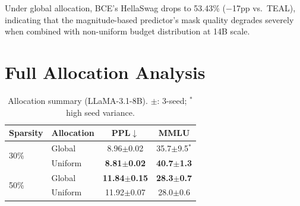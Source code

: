 \begin{table}[h]
\centering
\caption{Qwen-2.5-14B at 30\% nominal sparsity. Actual sparsity differs: KL 29.6\% (3-seed), TEAL 29.3\% (target 30\%). \textbf{Bold}: best sparse per column per group. BCE collapses to 6.4\% native sparsity (\S\ref{sec:method:gradient}), so forced global top-$k$ is used.}
\label{tab:14b}
\small
{}
\end{table}

Under global allocation, BCE's HellaSwag drops to 53.43\% ($-$17pp vs.\ TEAL), indicating that the magnitude-based predictor's mask quality degrades severely when combined with non-uniform budget distribution at 14B scale.

\section{Full Allocation Analysis}
\label{app:alloc_full}

\begin{table}[t]
\centering
\caption{Allocation summary (LLaMA-3.1-8B). $\pm$: 3-seed; $^\ast$high seed variance.}
\label{tab:phase}
\footnotesize
\begin{tabular}{llcc}
\toprule
Sparsity & Allocation & PPL$\downarrow$ & MMLU \\
\midrule
\multirow{2}{*}{30\%}
& Global & 8.96$\pm$0.02 & 35.7$\pm$9.5$^\ast$ \\
& Uniform & \textbf{8.81$\pm$0.02} & \textbf{40.7$\pm$1.3} \\
\midrule
\multirow{2}{*}{50\%}
& Global & \textbf{11.84$\pm$0.15} & \textbf{28.3$\pm$0.7} \\
& Uniform & 11.92$\pm$0.07 & 28.0$\pm$0.6 \\
\bottomrule
\end{tabular}
\end{table}

